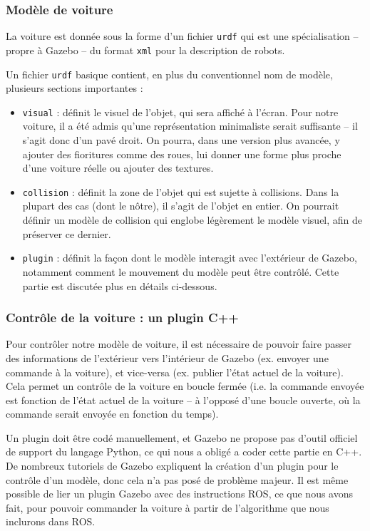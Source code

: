 \documentclass[a4paper,12pt]{report}
\newcommand{\bi}{\begin{itemize}}
\newcommand{\ei}{\end{itemize}}
\newcommand{\itemo}{\item[\textsf{o}]}
\begin{document}
\subsubsection{Modèle de voiture}
La voiture est donnée sous la forme d'un fichier \texttt{urdf} qui est une spécialisation -- propre à Gazebo -- du format \texttt{xml} pour la description de robots.

Un fichier \texttt{urdf} basique contient, en plus du conventionnel nom de modèle, plusieurs sections importantes :

\bi
	\itemo \texttt{visual} : définit le visuel de l'objet, qui sera affiché à l'écran. Pour notre voiture, il a été admis qu'une représentation minimaliste serait suffisante -- il s'agit donc d'un pavé droit. On pourra, dans une version plus avancée, y ajouter des fioritures comme des roues, lui donner une forme plus proche d'une voiture réelle ou ajouter des textures.
	\itemo \texttt{collision} : définit la zone de l'objet qui est sujette à collisions. Dans la plupart des cas (dont le nôtre), il s'agit de l'objet en entier. On pourrait définir un modèle de collision qui englobe légèrement le modèle visuel, afin de préserver ce dernier.
	\itemo \texttt{plugin} : définit la façon dont le modèle interagit avec l'extérieur de Gazebo, notamment comment le mouvement du modèle peut être contrôlé. Cette partie est discutée plus en détails ci-dessous.
\ei


\subsubsection{Contrôle de la voiture : un plugin C++}
Pour contrôler notre modèle de voiture, il est nécessaire de pouvoir faire passer des informations de l'extérieur vers l'intérieur de Gazebo (ex. envoyer une commande à la voiture), et vice-versa (ex. publier l'état actuel de la voiture). Cela permet un contrôle de la voiture en boucle fermée (i.e. la commande envoyée est fonction de l'état actuel de la voiture -- à l'opposé d'une boucle ouverte, où la commande serait envoyée en fonction du temps).

Un plugin doit être codé manuellement, et Gazebo ne propose pas d'outil officiel de support du langage Python, ce qui nous a obligé a coder cette partie en C++. De nombreux tutoriels de Gazebo expliquent la création d'un plugin pour le contrôle d'un modèle, donc cela n'a pas posé de problème majeur. Il est même possible de lier un plugin Gazebo avec des instructions ROS, ce que nous avons fait, pour pouvoir commander la voiture à partir de l'algorithme que nous inclurons dans ROS.
\end{document}

